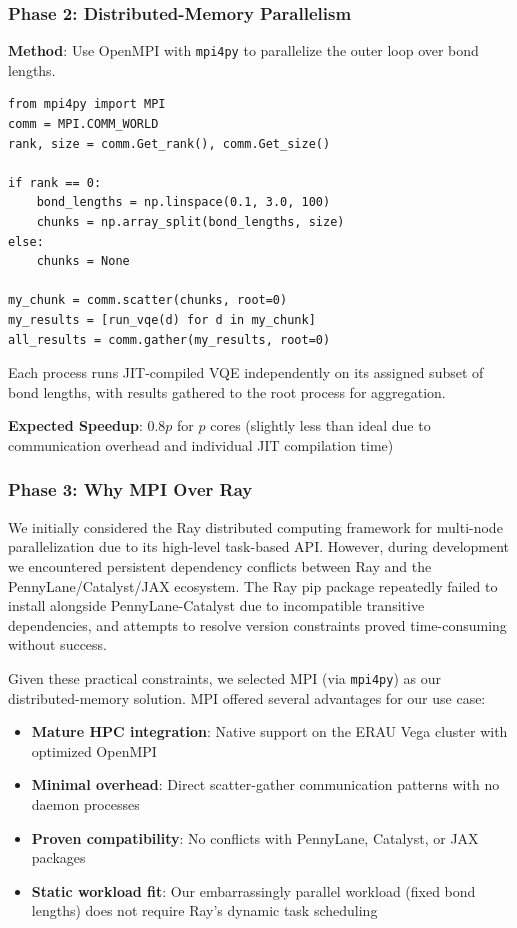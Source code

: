 \documentclass[11pt]{article}
\begin{document}
\subsubsection{Phase 2: Distributed-Memory Parallelism}

\textbf{Method}: Use OpenMPI with \texttt{mpi4py} to parallelize the outer loop over bond lengths.

\begin{lstlisting}[caption={MPI scatter-gather pattern for embarrassingly parallel VQE.}]
from mpi4py import MPI
comm = MPI.COMM_WORLD
rank, size = comm.Get_rank(), comm.Get_size()

if rank == 0:
    bond_lengths = np.linspace(0.1, 3.0, 100)
    chunks = np.array_split(bond_lengths, size)
else:
    chunks = None

my_chunk = comm.scatter(chunks, root=0)
my_results = [run_vqe(d) for d in my_chunk]
all_results = comm.gather(my_results, root=0)
\end{lstlisting}

Each process runs JIT-compiled VQE independently on its assigned subset of bond lengths, with results gathered to the root process for aggregation.

\textbf{Expected Speedup}: $0.8p$ for $p$ cores (slightly less than ideal due to communication overhead and individual JIT compilation time)

\subsubsection{Phase 3: Why MPI Over Ray}

We initially considered the Ray distributed computing framework for multi-node parallelization due to its high-level task-based API. However, during development we encountered persistent dependency conflicts between Ray and the PennyLane/Catalyst/JAX ecosystem. The Ray pip package repeatedly failed to install alongside PennyLane-Catalyst due to incompatible transitive dependencies, and attempts to resolve version constraints proved time-consuming without success.

Given these practical constraints, we selected MPI (via \texttt{mpi4py}) as our distributed-memory solution. MPI offered several advantages for our use case:
\begin{itemize}
    \item \textbf{Mature HPC integration}: Native support on the ERAU Vega cluster with optimized OpenMPI
    \item \textbf{Minimal overhead}: Direct scatter-gather communication patterns with no daemon processes
    \item \textbf{Proven compatibility}: No conflicts with PennyLane, Catalyst, or JAX packages
    \item \textbf{Static workload fit}: Our embarrassingly parallel workload (fixed bond lengths) does not require Ray's dynamic task scheduling
\end{itemize}
\end{document}

